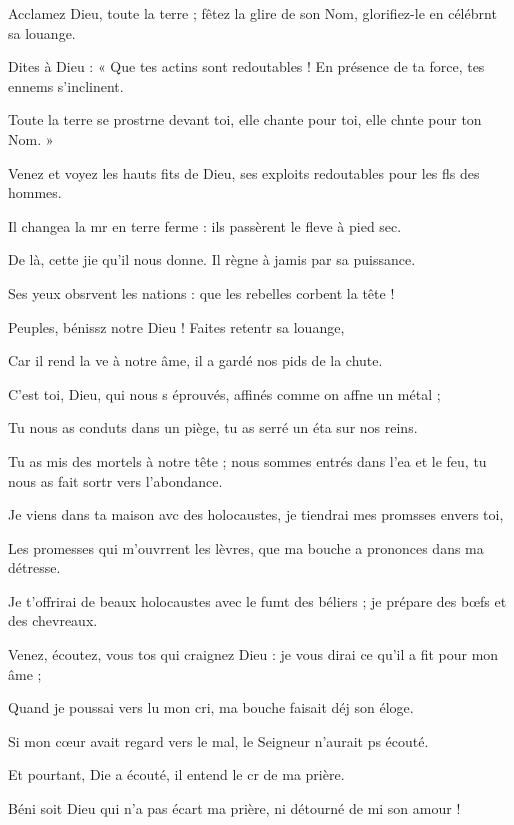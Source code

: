 \item Acclamez Dieu, toute la terre ; fêtez la glire de son Nom, glorifiez-le en célébrnt sa louange.
\item Dites à Dieu : « Que tes actins sont redoutables ! En présence de ta force, tes ennems s’inclinent.
\item Toute la terre se prostrne devant toi, elle chante pour toi, elle chnte pour ton Nom. »
\item Venez et voyez les hauts fits de Dieu, ses exploits redoutables pour les fls des hommes.
\item Il changea la mr en terre ferme : ils passèrent le fleve à pied sec. 
\item De là, cette jie qu’il nous donne. Il règne à jamis par sa puissance. 
\item Ses yeux obsrvent les nations : que les rebelles corbent la tête !
\item Peuples, bénissz notre Dieu ! Faites retentr sa louange,
\item Car il rend la ve à notre âme, il a gardé nos pids de la chute.
\item C’est toi, Dieu, qui nous s éprouvés, affinés comme on affne un métal ;
\item Tu nous as conduts dans un piège, tu as serré un éta sur nos reins.
\item Tu as mis des mortels à notre tête ; nous sommes entrés dans l’ea et le feu, tu nous as fait sortr vers l’abondance.
\item Je viens dans ta maison avc des holocaustes, je tiendrai mes promsses envers toi,
\item Les promesses qui m’ouvrrent les lèvres, que ma bouche a prononces dans ma détresse.
\item Je t’offrirai de beaux holocaustes avec le fumt des béliers ; je prépare des bœfs et des chevreaux.
\item Venez, écoutez, vous tos qui craignez Dieu : je vous dirai ce qu’il a fit pour mon âme ;
\item Quand je poussai vers lu mon cri, ma bouche faisait déj son éloge.
\item Si mon cœur avait regard vers le mal, le Seigneur n’aurait ps écouté.
\item Et pourtant, Die a écouté, il entend le cr de ma prière.
\item Béni soit Dieu qui n’a pas écart ma prière, ni détourné de mi son amour !